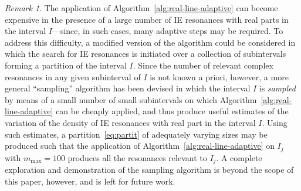 \documentclass[11pt]{article}
\theoremstyle{plain}
\theoremstyle{remark}
\newtheorem{remark}{Remark}
\begin{document}
\begin{remark}\label{rmk:Interval_Selection_Alg}
  The application of Algorithm~\ref{alg:real-line-adaptive} can become
  expensive in the presence of a large number of IE resonances with
  real parts in the interval $I$---since, in such cases, many adaptive
  steps may be required. To address this difficulty, a modified
  version of the algorithm could be considered in which the search
  for IE resonances is initiated over a collection of subintervals
  forming a partition of the interval $I$. Since the number of
  relevant complex resonances in any given subinterval of $I$ is not
  known a priori, however, a more general ``sampling'' algorithm has
  been devised in which the interval $I$ is {\em sampled} by means of
  a small number of small subintervals on which
  Algorithm~\ref{alg:real-line-adaptive} can be cheaply applied, and
  thus produce useful estimates of the variation of the density of IE
  resonances with real part in the interval $I$. Using such estimates,
  a partition~\eqref{eq:partit} of adequately varying sizes may be
  produced such that the application of
  Algorithm~\ref{alg:real-line-adaptive} on $I_j$ with
  $m_\mathrm{max} = 100$ produces all the resonances relevant to
  $I_j$. A complete exploration and demonstration of the sampling
  algorithm is beyond the scope of this paper, however, and is left
  for future work.
\end{remark}
\end{document}
